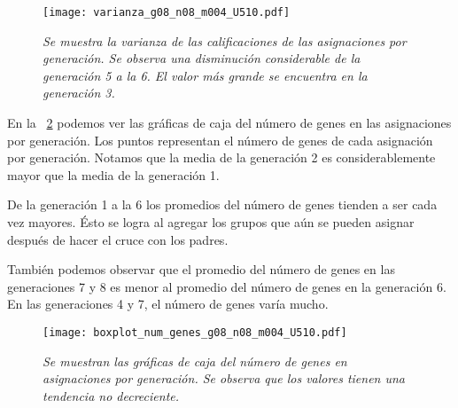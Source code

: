 \begin{figure}[H]
\centering
\texttt{[image: varianza\_g08\_n08\_m004\_U510.pdf]} %
\caption[\textit{Varianza de calificaciones de asignaciones por generación}]{\textit{Se muestra la varianza de las calificaciones de las asignaciones por generación. Se observa una disminución considerable de la generación 5 a la 6. El valor más grande se encuentra en la generación 3.}}\label{var_calif_x_generacion}
\end{figure}

En la \figurename{~\ref{boxplot_num_genes_x_generacion}} podemos ver las gráficas de caja del número de genes en las asignaciones por generación. Los puntos representan el número de genes de cada asignación por generación. Notamos que la media de la generación 2 es considerablemente mayor que la media de la generación 1.

De la generación 1 a la 6 los promedios del número de genes tienden a ser cada vez mayores. Ésto se logra al agregar los grupos que aún se pueden asignar después de hacer el cruce con los padres.

También podemos observar que el promedio del número de genes en las generaciones 7 y 8 es menor al promedio del número de genes en la generación 6. En las generaciones 4 y 7, el número de genes varía mucho.

\begin{figure}[h]
\centering
\texttt{[image: boxplot\_num\_genes\_g08\_n08\_m004\_U510.pdf]} %
\caption[\textit{Gráficas de caja del número de genes en asignaciones por generación}]{\textit{Se muestran las gráficas de caja del número de genes en asignaciones por generación. Se observa que los valores tienen una tendencia no decreciente.}}\label{boxplot_num_genes_x_generacion}
\end{figure}


%

